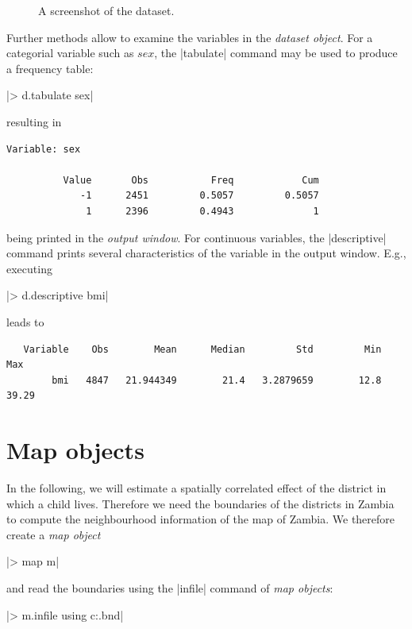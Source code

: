 \vspace{1cm}

\begin{figure}[ht]
\begin{center}
 {\it\caption{A
screenshot of the dataset.\label{reml:screenshot}}}
\end{center}
\end{figure}

Further methods allow to examine the variables in the {\it dataset object}. For a categorial variable such as $\mathit{sex}$,
the |tabulate| command may be used to produce a frequency table:

|> d.tabulate sex|

resulting in

\begin{verbatim}
Variable: sex

          Value       Obs           Freq            Cum
             -1      2451         0.5057         0.5057
              1      2396         0.4943              1
\end{verbatim}

being printed in the {\it output window}. For continuous variables,  the |descriptive| command prints several characteristics
of the variable in the {output window}. E.g., executing

|> d.descriptive bmi|

leads to

\begin{verbatim}
   Variable    Obs        Mean      Median         Std         Min         Max
        bmi   4847   21.944349        21.4   3.2879659        12.8       39.29
\end{verbatim}

\section{Map objects}\label{reml:maps}

In the following, we will estimate a spatially correlated effect of the district in which a child lives. Therefore we need the
boundaries of the districts in Zambia to compute the neighbourhood information of the map of Zambia. We therefore create a {\it
map object}

|> map m|

and read the boundaries using the |infile| command of {\it map objects}:

|> m.infile using c:\data\zambia.bnd|

